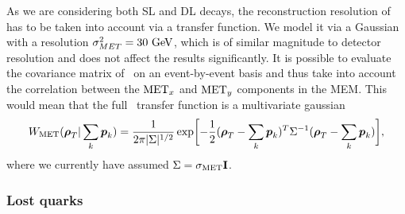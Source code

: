 As we are considering both SL and DL \ttH decays, the reconstruction resolution of \MET has to be taken into account via a transfer function. We model it via a Gaussian with a resolution $\sigma_{MET}^2 = 30~\mathrm{GeV}$, which is of similar magnitude to detector resolution and does not affect the results significantly.
It is possible to evaluate the covariance matrix of \MET~on an event-by-event basis and thus take into account the correlation between the $\mathrm{MET}_x$ and $\mathrm{MET}_y$ components in the MEM\cite{cms_htautau}. This would mean that the full \MET~transfer function is a multivariate gaussian
\begin{equation}
W_{\mathrm{MET}}(\boldsymbol{\rho}_T | \sum_k \boldsymbol{p}_k) = \frac{1}{2\pi |\Sigma|^{1/2}} \exp \biggl[ -\frac{1}{2} (\boldsymbol{\rho}_T - \sum_k \boldsymbol{p}_k)^T \Sigma^{-1} (\boldsymbol{\rho}_T - \sum_k \boldsymbol{p}_k)\biggr],
\end{equation}
where we currently have assumed $\Sigma = \sigma_{\mathrm{MET}} \mathbf{I}$.

\subsubsection{Lost quarks}
\label{sec:lost_quarks}

